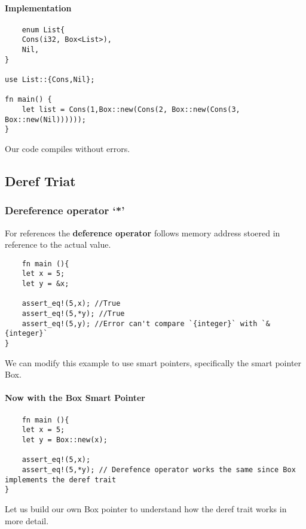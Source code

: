 \paragraph*{Implementation}\begin{lstlisting}
    enum List{
    Cons(i32, Box<List>),
    Nil,
}

use List::{Cons,Nil};

fn main() {
    let list = Cons(1,Box::new(Cons(2, Box::new(Cons(3, Box::new(Nil))))));
}
\end{lstlisting} 
Our code compiles without errors.

\subsection{Deref Triat}
\subsubsection{Dereference operator `*'}

\begin{definition}
    For references the \textbf{deference operator} follows memory address stoered in reference to the actual value.
\end{definition}

\begin{lstlisting}
    fn main (){
    let x = 5;
    let y = &x;

    assert_eq!(5,x); //True
    assert_eq!(5,*y); //True 
    assert_eq!(5,y); //Error can't compare `{integer}` with `&{integer}`
}
\end{lstlisting}

We can modify this example to use smart pointers, specifically the smart pointer Box.
\paragraph*{Now with the Box Smart Pointer}\begin{lstlisting}
    fn main (){
    let x = 5;
    let y = Box::new(x);

    assert_eq!(5,x);
    assert_eq!(5,*y); // Derefence operator works the same since Box implements the deref trait
}
\end{lstlisting}

Let us build our own Box pointer to understand how the deref trait works in more detail.


